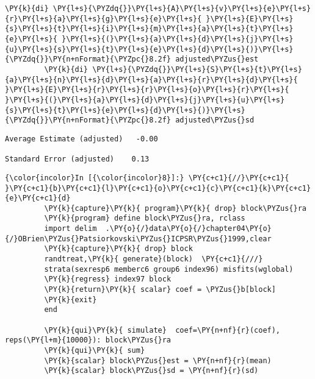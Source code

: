 \documentclass[11pt,notitlepage]{article}\usepackage[]{graphicx}\usepackage[]{color}
\makeatletter
\newenvironment{kframe}{%
 \def\at@end@of@kframe{}%
 \ifinner\ifhmode%
  \def\at@end@of@kframe{\end{minipage}}%
  \begin{minipage}{\columnwidth}%
 \fi\fi%
 \def\FrameCommand##1{\hskip\@totalleftmargin \hskip-\fboxsep
 \colorbox{shadecolor}{##1}\hskip-\fboxsep
     \hskip-\linewidth \hskip-\@totalleftmargin \hskip\columnwidth}%
 \MakeFramed {\advance\hsize-\width
   \@totalleftmargin\z@ \linewidth\hsize
   \@setminipage}}%
 {\par\unskip\endMakeFramed%
 \at@end@of@kframe}
\newenvironment{knitrout}{}{} %
\makeatother
\begin{document}
\begin{enumerate}[a)]
\begin{knitrout}
\begin{kframe}
\begin{Verbatim}[commandchars=\\\{\}]
         \PY{k}{di} \PY{l+s}{\PYZdq{}}\PY{l+s}{A}\PY{l+s}{v}\PY{l+s}{e}\PY{l+s}{r}\PY{l+s}{a}\PY{l+s}{g}\PY{l+s}{e}\PY{l+s}{ }\PY{l+s}{E}\PY{l+s}{s}\PY{l+s}{t}\PY{l+s}{i}\PY{l+s}{m}\PY{l+s}{a}\PY{l+s}{t}\PY{l+s}{e}\PY{l+s}{ }\PY{l+s}{(}\PY{l+s}{a}\PY{l+s}{d}\PY{l+s}{j}\PY{l+s}{u}\PY{l+s}{s}\PY{l+s}{t}\PY{l+s}{e}\PY{l+s}{d}\PY{l+s}{)}\PY{l+s}{\PYZdq{}}\PY{n+nFormat}{\PYZpc{}8.2f} adjusted\PYZus{}est
         \PY{k}{di} \PY{l+s}{\PYZdq{}}\PY{l+s}{S}\PY{l+s}{t}\PY{l+s}{a}\PY{l+s}{n}\PY{l+s}{d}\PY{l+s}{a}\PY{l+s}{r}\PY{l+s}{d}\PY{l+s}{ }\PY{l+s}{E}\PY{l+s}{r}\PY{l+s}{r}\PY{l+s}{o}\PY{l+s}{r}\PY{l+s}{ }\PY{l+s}{(}\PY{l+s}{a}\PY{l+s}{d}\PY{l+s}{j}\PY{l+s}{u}\PY{l+s}{s}\PY{l+s}{t}\PY{l+s}{e}\PY{l+s}{d}\PY{l+s}{)}\PY{l+s}{\PYZdq{}}\PY{n+nFormat}{\PYZpc{}8.2f} adjusted\PYZus{}sd
\end{Verbatim}

    \begin{Verbatim}[commandchars=\\\{\}]
Average Estimate (adjusted)   -0.00

Standard Error (adjusted)    0.13

    \end{Verbatim}

    \begin{Verbatim}[commandchars=\\\{\}]
{\color{incolor}In [{\color{incolor}8}]:} \PY{c+c1}{//}\PY{c+c1}{ }\PY{c+c1}{b}\PY{c+c1}{l}\PY{c+c1}{o}\PY{c+c1}{c}\PY{c+c1}{k}\PY{c+c1}{e}\PY{c+c1}{d}
         \PY{k}{capture}\PY{k}{ program}\PY{k}{ drop} block\PYZus{}ra
         \PY{k}{program} define block\PYZus{}ra, rclass
         import delim  .\PY{o}{/}data\PY{o}{/}chapter04\PY{o}{/}OBrien\PYZus{}Patsiorkovski\PYZus{}ICPSR\PYZus{}1999,clear
         \PY{k}{capture}\PY{k}{ drop} block
         randtreat,\PY{k}{ generate}(block)  \PY{c+c1}{///}
         strata(sexresp6 memberc6 group6 index96) misfits(wglobal)
         \PY{k}{regress} index97 block
         \PY{k}{return}\PY{k}{ scalar} coef = \PYZus{}b[block]
         \PY{k}{exit}
         end
                
         \PY{k}{qui}\PY{k}{ simulate}  coef=\PY{n+nf}{r}(coef), reps(\PY{l+m}{10000}): block\PYZus{}ra
         \PY{k}{qui}\PY{k}{ sum}
         \PY{k}{scalar} block\PYZus{}est = \PY{n+nf}{r}(mean)
         \PY{k}{scalar} block\PYZus{}sd = \PY{n+nf}{r}(sd)
         

\end{Verbatim}
\end{kframe}
\end{knitrout}
\end{enumerate}
\end{document}
